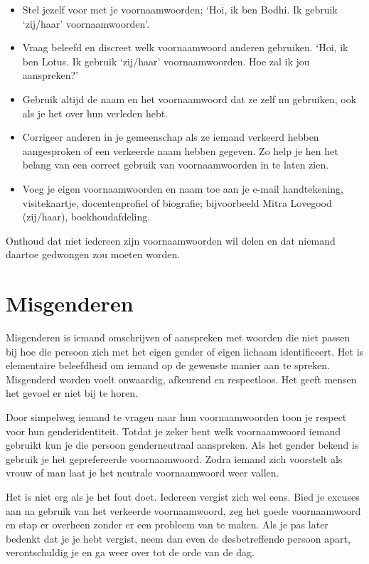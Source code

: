 \documentclass[12pt,openany]{book}
\begin{document}
\begin{itemize}
\setlength\itemsep{-0.3em}
\item Stel jezelf voor met je voornaamwoorden; `Hoi, ik ben Bodhi. Ik gebruik `zij/haar' voornaamwoorden'. 
\item Vraag beleefd en discreet welk voornaamwoord anderen gebruiken. `Hoi, ik ben Lotus. Ik gebruik `zij/haar' voornaamwoorden. Hoe zal ik jou aanspreken?' 
\item Gebruik altijd de naam en het voornaamwoord dat ze zelf nu gebruiken, ook als je het over hun verleden hebt.
\item Corrigeer anderen in je gemeenschap als ze iemand verkeerd hebben aangesproken of een verkeerde naam hebben gegeven. Zo help je hen het belang van een correct gebruik van voornaamwoorden in te laten zien.
\item Voeg je eigen voornaamwoorden en naam toe aan je e-mail handtekening, visitekaartje, docentenprofiel of biografie; bijvoorbeeld Mitra Lovegood (zij/haar), boekhoudafdeling.
\end{itemize}

Onthoud dat niet iedereen zijn voornaamwoorden wil delen en dat niemand daartoe gedwongen zou moeten worden. 

\section*{Misgenderen}

Misgenderen is iemand omschrijven of aanspreken met woorden die niet passen bij hoe die persoon zich met het eigen gender of eigen lichaam identificeert. Het is elementaire beleefdheid om iemand op de gewenste manier aan te spreken. Misgenderd worden voelt onwaardig, afkeurend en respectloos. Het geeft mensen het gevoel er niet bij te horen. 

Door simpelweg iemand te vragen naar hun voornaamwoorden toon je respect voor hun genderidentiteit. Totdat je zeker bent welk voornaamwoord iemand gebruikt kun je die persoon genderneutraal aanspreken. Als het gender bekend is gebruik je het geprefereerde voornaamwoord. Zodra iemand zich voorstelt als vrouw of man laat je het neutrale voornaamwoord weer vallen.

Het is niet erg als je het fout doet. Iedereen vergist zich wel eens. Bied je excuses aan na gebruik van het verkeerde voornaamwoord, zeg het goede voornaamwoord en stap er overheen zonder er een probleem van te maken. Als je pas later bedenkt dat je je hebt vergist, neem dan even de desbetreffende persoon apart, verontschuldig je en ga weer over tot de orde van de dag.
\end{document}
